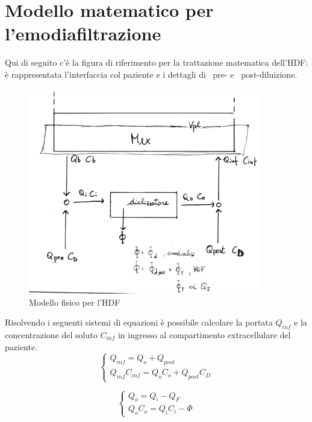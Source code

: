 
\chapter{Modello matematico per l'emodiafiltrazione}
Qui di seguito c'è la figura di riferimento per la trattazione matematica dell'HDF: è rappresentata l'interfaccia col paziente e i dettagli di ~pre- e ~post-diluizione.\\
\begin{figure}[htbp]
	\centering
		\includegraphics[width=0.90\textwidth]{immagini/modellofisico.eps}
	\caption{Modello fisico per l'HDF}
	\label{fig:modellofisico}
\end{figure}

Risolvendo i seguenti sistemi di equazioni è possibile calcolare la portata $Q_{inf}$ e la concentrazione del soluto $C_{inf}$ in ingresso al compartimento extracellulare del paziente.\\

\begin{equation}\label{sistinf}
	\left\{
		\begin{array}{l}
			Q_{inf} = Q_o+Q_{post}\\
			Q_{inf}C_{inf} = Q_oC_o + Q_{post}C_D
		\end{array}
	\right.
\end{equation}

\begin{equation}\label{sistout}
	\left\{
		\begin{array}{l}
			Q_o =Q_i-Q_F\\
			Q_oC_o =Q_iC_i-\Phi
		\end{array}
	\right.
\end{equation}

